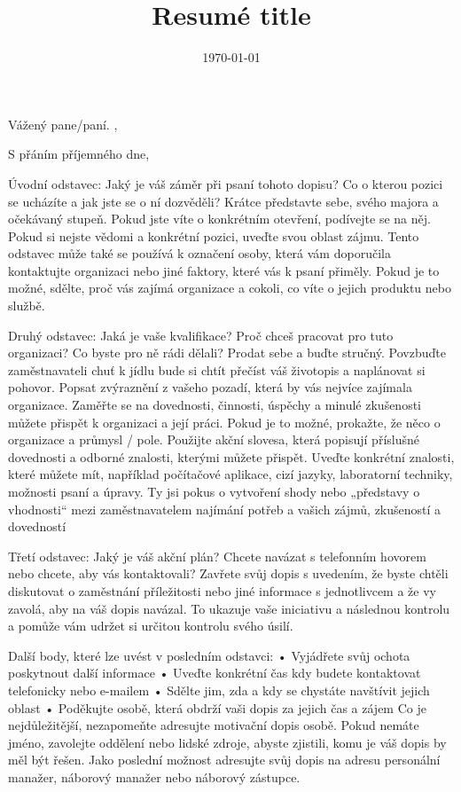 \documentclass[12pt,a4paper,roman, colorlinks, linkcolor=cyan]{moderncv}
\title{Resumé title}
\begin{document}
\hypersetup{urlcolor= blue}

\date{\today} 
\opening{Vážený pane/paní. ,} 
\closing{S přáním příjemného dne,}

\makelettertitle

Úvodní odstavec: Jaký je váš záměr při psaní tohoto dopisu? Co
o kterou pozici se ucházíte a jak jste se o ní dozvěděli? Krátce
představte sebe, svého majora a očekávaný stupeň. Pokud jste
víte o konkrétním otevření, podívejte se na něj. Pokud si nejste vědomi a
konkrétní pozici, uveďte svou oblast zájmu. Tento odstavec může
také se používá k označení osoby, která vám doporučila
kontaktujte organizaci nebo jiné faktory, které vás k psaní přiměly.
Pokud je to možné, sdělte, proč vás zajímá organizace a
cokoli, co víte o jejich produktu nebo službě.

Druhý odstavec: Jaká je vaše kvalifikace? Proč chceš
pracovat pro tuto organizaci? Co byste pro ně rádi dělali? Prodat
sebe a buďte stručný. Povzbuďte zaměstnavateli chuť k jídlu
bude si chtít přečíst váš životopis a naplánovat si pohovor. Popsat
zvýraznění z vašeho pozadí, která by vás nejvíce zajímala
organizace. Zaměřte se na dovednosti, činnosti, úspěchy a
minulé zkušenosti můžete přispět k organizaci a její práci.
Pokud je to možné, prokažte, že něco o
organizace a průmysl / pole. Použijte akční slovesa, která popisují
příslušné dovednosti a odborné znalosti, kterými můžete přispět. Uveďte konkrétní
znalosti, které můžete mít, například počítačové aplikace, cizí
jazyky, laboratorní techniky, možnosti psaní a úpravy. Ty jsi
pokus o vytvoření shody nebo „představy o vhodnosti“ mezi zaměstnavatelem
najímání potřeb a vašich zájmů, zkušeností a dovedností

Třetí odstavec: Jaký je váš akční plán? Chcete navázat
s telefonním hovorem nebo chcete, aby vás kontaktovali? Zavřete svůj
dopis s uvedením, že byste chtěli diskutovat o zaměstnání
příležitosti nebo jiné informace s jednotlivcem a že vy
zavolá, aby na váš dopis navázal. To ukazuje vaše
iniciativu a následnou kontrolu a pomůže vám udržet si určitou kontrolu
svého úsilí.

Další body, které lze uvést v posledním odstavci: • Vyjádřete svůj
ochota poskytnout další informace • Uveďte konkrétní čas
kdy budete kontaktovat telefonicky nebo e-mailem • Sdělte jim, zda a kdy
se chystáte navštívit jejich oblast • Poděkujte osobě, která obdrží vaši
dopis za jejich čas a zájem Co je nejdůležitější, nezapomeňte
adresujte motivační dopis osobě. Pokud nemáte jméno, zavolejte
oddělení nebo lidské zdroje, abyste zjistili, komu je váš dopis
by měl být řešen. Jako poslední možnost adresujte svůj dopis na adresu
personální manažer, náborový manažer nebo náborový zástupce.

\makeletterclosing
\end{document}
